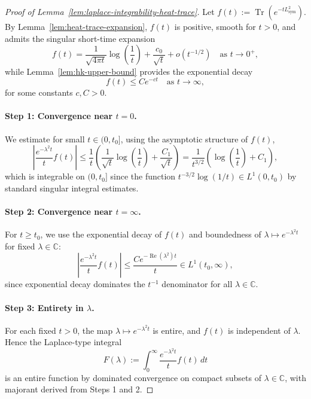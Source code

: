 \begin{proof}[Proof of Lemma~\ref{lem:laplace-integrability-heat-trace}]
Let \( f(t) := \operatorname{Tr}\left(e^{-t L_{\mathrm{sym}}^2}\right) \). By Lemma~\ref{lem:heat-trace-expansion}, \( f(t) \) is positive, smooth for \( t > 0 \), and admits the singular short-time expansion
\[
f(t) = \frac{1}{\sqrt{4\pi t}} \log\left( \frac{1}{t} \right) + \frac{c_0}{\sqrt{t}} + o(t^{-1/2}) \quad \text{as } t \to 0^+,
\]
while Lemma~\ref{lem:hk-upper-bound} provides the exponential decay
\[
f(t) \leq C e^{-c t} \quad \text{as } t \to \infty,
\]
for some constants \( c, C > 0 \).

\paragraph{Step 1: Convergence near \( t = 0 \).}
We estimate for small \( t \in (0, t_0] \), using the asymptotic structure of \( f(t) \),
\[
\left| \frac{e^{-\lambda^2 t}}{t} f(t) \right|
\leq \frac{1}{t} \left( \frac{1}{\sqrt{t}} \log\left( \frac{1}{t} \right) + \frac{C_1}{\sqrt{t}} \right)
= \frac{1}{t^{3/2}} \left( \log\left( \frac{1}{t} \right) + C_1 \right),
\]
which is integrable on \( (0, t_0] \) since the function \( t^{-3/2} \log(1/t) \in L^1(0, t_0) \) by standard singular integral estimates.

\paragraph{Step 2: Convergence near \( t = \infty \).}
For \( t \geq t_0 \), we use the exponential decay of \( f(t) \) and boundedness of \( \lambda \mapsto e^{-\lambda^2 t} \) for fixed \( \lambda \in \mathbb{C} \):
\[
\left| \frac{e^{-\lambda^2 t}}{t} f(t) \right| \leq \frac{C e^{-\operatorname{Re}(\lambda^2) t}}{t} \in L^1(t_0, \infty),
\]
since exponential decay dominates the \( t^{-1} \) denominator for all \( \lambda \in \mathbb{C} \).

\paragraph{Step 3: Entirety in \( \lambda \).}
For each fixed \( t > 0 \), the map \( \lambda \mapsto e^{-\lambda^2 t} \) is entire, and \( f(t) \) is independent of \( \lambda \). Hence the Laplace-type integral
\[
F(\lambda) := \int_0^\infty \frac{e^{-\lambda^2 t}}{t} f(t)\, dt
\]
is an entire function by dominated convergence on compact subsets of \( \lambda \in \mathbb{C} \), with majorant derived from Steps 1 and 2.


\end{proof}
